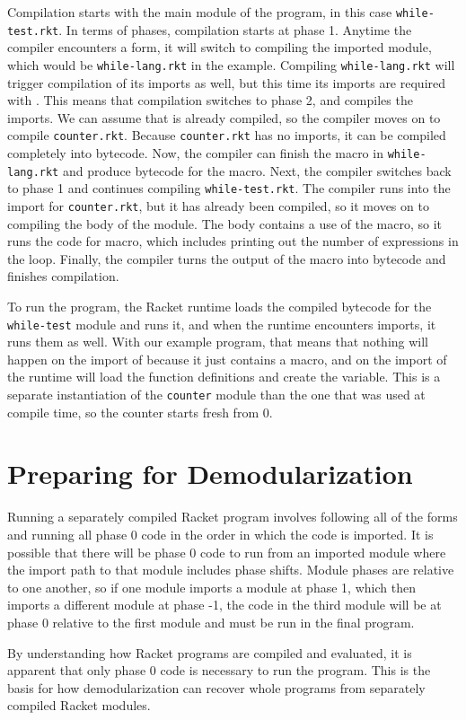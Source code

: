 Compilation starts with the main module of the program, in this case \texttt{while-test.rkt}.
In terms of phases, compilation starts at phase 1.
Anytime the compiler encounters a  form, it will switch to compiling the imported module, which would be \texttt{while-lang.rkt} in the example.
Compiling \texttt{while-lang.rkt} will trigger compilation of its imports as well, but this time its imports are required with .
This means that compilation switches to phase 2, and compiles the imports.
We can assume that  is already compiled, so the compiler moves on to compile \texttt{counter.rkt}. 
Because \texttt{counter.rkt} has no imports, it can be compiled completely into bytecode.
Now, the compiler can finish the macro in \texttt{while-lang.rkt} and produce bytecode for the macro. 
Next, the compiler switches back to phase 1 and continues compiling \texttt{while-test.rkt}.
The compiler runs into the import for \texttt{counter.rkt}, but it has already been compiled, so it moves on to compiling the body of the module.
The body contains a use of the  macro, so it runs the code for macro, which includes printing out the number of expressions in the  loop. 
Finally, the compiler turns the output of the macro into bytecode and finishes compilation.

To run the program, the Racket runtime loads the compiled bytecode for the \texttt{while-test} module and runs it, and when the runtime encounters imports, it runs them as well. 
With our example program, that means that nothing will happen on the import of  because it just contains a macro, and on the import of  the runtime will load the function definitions and create the  variable.
This is a separate instantiation of the \texttt{counter} module than the one that was used at compile time, so the counter starts fresh from 0.



\section{Preparing for Demodularization}

Running a separately compiled Racket program involves following all of the  forms and running all phase 0 code in the order in which the code is imported.
It is possible that there will be phase 0 code to run from an imported module where the import path to that module includes phase shifts.
Module phases are relative to one another, so if one module imports a module at phase 1, which then imports a different module at phase -1, the code in the third module will be at phase 0 relative to the first module and must be run in the final program.

By understanding how Racket programs are compiled and evaluated, it is apparent that only phase 0 code is necessary to run the program. 
This is the basis for how demodularization can recover whole programs from separately compiled Racket modules. 
